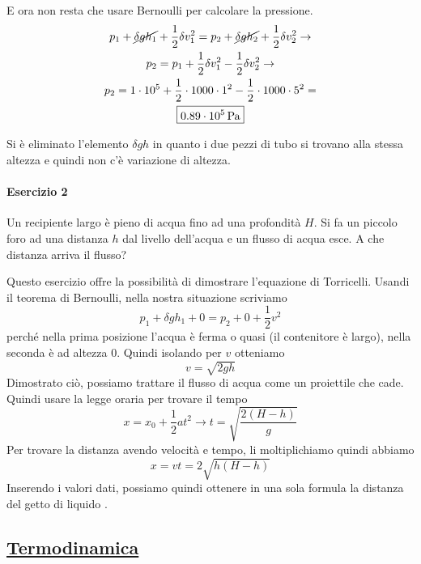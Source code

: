 E ora non resta che usare Bernoulli per	calcolare la pressione.
\begin{gather*}
p_1 + \cancel{\delta gh_1} + 
\frac{1}{2}\delta v_1^2 = 
p_2 + \cancel{\delta gh_2} +
\frac{1}{2}\delta v_2^2 \rightarrow \\
p_2 = p_1 + \frac{1}{2}\delta v_1^2 - \frac{1}{2}\delta v_2^2 \rightarrow\\
p_2 = 1\cdot10^5 + \frac{1}{2}\cdot1000\cdot1^2 - \frac{1}{2}\cdot1000\cdot5^2 =\\
\boxed{0.89\cdot10^5\,\text{Pa}}
\end{gather*}

Si è eliminato l'elemento $\delta gh$ in quanto i due pezzi di tubo si trovano alla stessa altezza
e quindi non c'è variazione di altezza.

\paragraph{Esercizio 2}
Un recipiente largo è pieno di acqua fino ad una profondità $H$. Si fa un piccolo foro ad una 
distanza $h$ dal livello dell'acqua e un flusso di acqua esce. A che distanza arriva il flusso?
\divisor

Questo esercizio offre la possibilità di dimostrare l'equazione di Torricelli. Usandi il teorema di
Bernoulli, nella nostra situazione scriviamo
\begin{equation*}
p_1+\delta gh_1+0=p_2+0+\frac{1}{2}v^2
\end{equation*}
perché nella prima posizione l'acqua è ferma o quasi (il contenitore è largo), nella seconda è ad 
altezza $0$. Quindi isolando per $v$ otteniamo
\begin{equation*}
v=\sqrt{2gh}
\end{equation*}
Dimostrato ciò, possiamo trattare il flusso di acqua come un proiettile che cade. Quindi usare la 
legge oraria per trovare il tempo
\begin{equation*}
x=x_0+\frac{1}{2}at^2 \rightarrow t = \sqrt{\frac{2(H-h)}{g}}
\end{equation*}
Per trovare la distanza avendo velocità e tempo, li moltiplichiamo quindi abbiamo
\begin{equation*}
\boxed{x = vt = 2\sqrt{h(H-h)}}
\end{equation*}
Inserendo i valori dati, possiamo quindi ottenere in una sola formula la distanza del getto di liquido
.

\subsection*{\hyperref[sec:termodinamica]{Termodinamica}}\label{ex:termodinamica}

